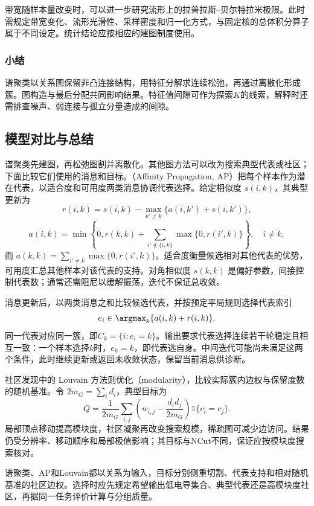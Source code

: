 带宽随样本量改变时，可以进一步研究流形上的拉普拉斯--贝尔特拉米极限。此时需规定带宽变化、流形光滑性、采样密度和归一化方式，与固定核的总体积分算子属于不同设定。统计结论应按相应的建图制度使用。

\subsubsection{小结}

谱聚类以关系图保留非凸连接结构，用特征分解求连续松弛，再通过离散化形成簇。图构造与最后分配共同影响结果。特征值间隙可作为探索$K$的线索，解释时还需排查噪声、弱连接与孤立分量造成的间隙。

\subsection{模型对比与总结}

谱聚类先建图，再松弛图割并离散化。其他图方法可以改为搜索典型代表或社区；下面比较它们使用的消息和目标。（Affinity Propagation, AP）把每个样本作为潜在代表，以适合度和可用度两类消息协调代表选择。给定相似度 $s(i,k)$，其典型更新为
\[
 r(i,k)=s(i,k)-\max_{k'\ne k}\{a(i,k')+s(i,k')\},
\]
\[
 a(i,k)=
 \min\left\{0,r(k,k)+
 \sum_{i'\notin\{i,k\}}\max\{0,r(i',k)\}\right\},
 \quad i\ne k,
\]
而 $a(k,k)=\sum_{i'\ne k}\max\{0,r(i',k)\}$。适合度衡量候选相对其他代表的优势，可用度汇总其他样本对该代表的支持。对角相似度 $s(k,k)$ 是偏好参数，间接控制代表数；通常还需阻尼以缓解振荡，迭代不保证总收敛。

消息更新后，以两类消息之和比较候选代表，并按预定平局规则选择代表索引
\[
 e_i\in\argmax_k\{a(i,k)+r(i,k)\}.
\]
同一代表对应同一簇，即$C_k=\{i:e_i=k\}$。输出要求代表选择连续若干轮稳定且相互一致：一个样本选择$k$时，$e_k=k$，即代表选自身。中间迭代可能尚未满足这两个条件，此时继续更新或返回未收敛状态，保留当前消息供诊断。

社区发现中的 Louvain 方法则优化（modularity），比较实际簇内边权与保留度数的随机基准。令 $2m_G=\sum_i d_i$，典型目标为
\[
 Q=\frac{1}{2m_G}\sum_{i,j}
 \left(w_{i,j}-\frac{d_i d_j}{2m_G}\right)
 \mathbb{1}\{c_i=c_j\}.
\]
局部顶点移动提高模块度，社区凝聚再改变搜索规模，稀疏图可减少边访问。结果仍受分辨率、移动顺序和局部极值影响；其目标与NCut不同，保证应按模块度搜索核对。

谱聚类、AP和Louvain都以关系为输入，目标分别侧重切割、代表支持和相对随机基准的社区边权。选择时应先规定希望输出低电导集合、典型代表还是高模块度社区，再据同一任务评价计算与分组质量。

